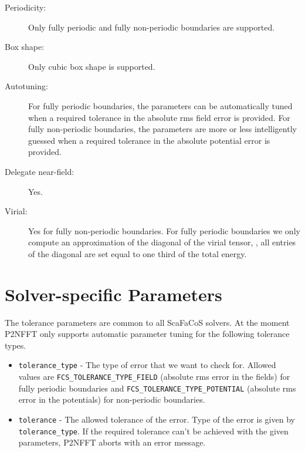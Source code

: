 \begin{description}
\item[Periodicity:] Only fully periodic and fully non-periodic boundaries are supported.
\item[Box shape:] Only cubic box shape is supported.
\item[Autotuning:] For fully periodic boundaries, the parameters can be automatically tuned when a
  required tolerance in the absolute rms field error is provided. For fully non-periodic boundaries,
  the parameters are more or less intelligently guessed when a required tolerance in the absolute
  potential error is provided.  
\item[Delegate near-field:] Yes.
\item[Virial:] Yes for fully non-periodic boundaries. For fully periodic boundaries we only compute an approximation of
  the diagonal of the virial tensor, \ie, all entries of the diagonal are set equal to one third of the total energy.
\end{description}

\section{Solver-specific Parameters}
The tolerance parameters are common to all ScaFaCoS solvers. At the moment P2NFFT only supports automatic parameter tuning for the following tolerance types.
\begin{itemize}
  \item \verb!tolerance_type! -
    The type of error that we want to check for. Allowed values are \verb!FCS_TOLERANCE_TYPE_FIELD! (absolute rms error in the fields)
    for fully periodic boundaries and \verb!FCS_TOLERANCE_TYPE_POTENTIAL! (absolute rms error in the potentials) for non-periodic boundaries.
  \item \verb!tolerance! -
    The allowed tolerance of the error. Type of the error is given by \verb!tolerance_type!. If the required tolerance can't be achieved
    with the given parameters, P2NFFT aborts with an error message.
\end{itemize}

